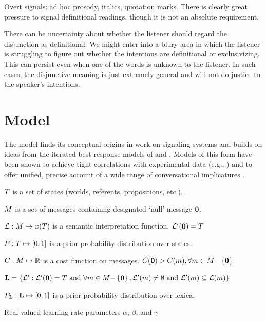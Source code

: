 \documentclass{article}
\begin{document}
Overt signals: ad hoc prosody, italics, quotation marks. There is
clearly great pressure to signal definitional readings, though it is
not an absolute requirement.


There can be uncertainty about whether the listener should regard the
disjunction as definitional. We might enter into a blury area in which
the listener is struggling to figure out whether the intentions are
definitional or exclusivizing. This can persist even when one of the
words is unknown to the listener. In such cases, the disjunctive
meaning is just extremely general and will not do justice to the
speaker's intentions.



\section{Model}\label{sec:model}

The model finds its conceptual origins in  work on
signaling systems and builds on ideas from the iterated best response
models of \citet{Jaeger:2007,Jaeger:2011} and
\citet{Franke09DISS}. Models of this form have been shown to achieve
tight correlations with experimental data (e.g.,
\citealt{Frank:Goodman:2012}) and to offer unified, precise account of
a wide range of conversational implicatures
\citep{bergen-levy-goodman:2014}.

\begin{examples}
\item\label{model}
  \begin{examples}
  \item\label{states}%
    $T$ is a set of states (worlds, referents, propositions, etc.).
  \item\label{messages}%
    $M$ is a set of messages containing designated `null' message $\mathbf{0}$.
  \item\label{lex}%
    $\mathcal{L}: M \mapsto \wp(T)$ is a semantic interpretation function. 
    $\mathcal{L}'(\mathbf{0}) = T$
  \item\label{prior}%
    $P : T \mapsto [0,1]$ is a prior probability
    distribution over states.    
  \item\label{costs}%
    $C : M \mapsto \mathbb{R}$ is a cost function on messages.
    $C(\mathbf{0}) > C(m), {\forall m \in M{-}\left\{ \mathbf{0} \right\}}$
  \item\label{lexset}%
      $\mathbf{L} = \left\{ \mathcal{L}' : \mathcal{L}'(\mathbf{0}) = T \text{ and } 
      \forall m \in M{-}\left\{ \mathbf{0} \right\}, 
      \mathcal{L}'(m) \neq \emptyset \text{ and } 
      \mathcal{L}'(m) \subseteq \mathcal{L}(m) \right\}$
  \item\label{LexPrior}%
    $P_{\mathbf{L}} : \mathbf{L} \mapsto [0,1]$ is a prior
    probability distribution over lexica.
  \item\label{temps}%
    Real-valued learning-rate parameters $\alpha$, $\beta$, and
    $\gamma$
  \end{examples}
\end{examples}
\end{document}
